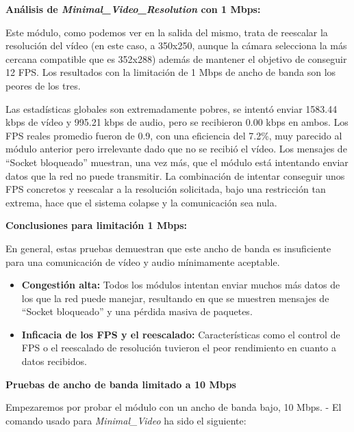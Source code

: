 \vspace{\baselineskip}

\textbf{Análisis de \textit{Minimal\_Video\_Resolution} con 1 Mbps:}
\vspace{\baselineskip}

Este módulo, como podemos ver en la salida del mismo, trata de reescalar la resolución del vídeo (en este caso, a 350x250, aunque la cámara selecciona la más cercana compatible que es 352x288) además de mantener el objetivo de conseguir 12 FPS. Los resultados con la limitación de 1 Mbps de ancho de banda son los peores de los tres.
\vspace{\baselineskip}

Las estadísticas globales son extremadamente pobres, se intentó enviar 1583.44 kbps de vídeo y 995.21 kbps de audio, pero se recibieron 0.00 kbps en ambos. Los FPS reales promedio fueron de 0.9, con una eficiencia del 7.2\%, muy parecido al módulo anterior pero irrelevante dado que no se recibió el vídeo. Los mensajes de ``Socket bloqueado'' muestran, una vez más, que el módulo está intentando enviar datos que la red no puede transmitir. La combinación de intentar conseguir unos FPS concretos y reescalar a la resolución solicitada, bajo una restricción tan extrema, hace que el sistema colapse y la comunicación sea nula.

\textbf{Conclusiones para limitación 1 Mbps:}

En general, estas pruebas demuestran que este ancho de banda es insuficiente para una comunicación de vídeo y audio mínimamente aceptable.
\begin{itemize}
    \item \textbf{Congestión alta:} Todos los módulos intentan enviar muchos más datos de los que la red puede manejar, resultando en que se muestren mensajes de ``Socket bloqueado'' y una pérdida masiva de paquetes.
    \item \textbf{Inficacia de los FPS y el reescalado:} Características como el control de FPS o el reescalado de resolución tuvieron el peor rendimiento en cuanto a datos recibidos.
\end{itemize}

\newpage

\textbf{Pruebas de ancho de banda limitado a 10 Mbps}
\vspace{\baselineskip}

Empezaremos por probar el módulo con un ancho de banda bajo, 10 Mbps.
- El comando usado para \textit{Minimal\_Video} ha sido el siguiente:
\vspace{\baselineskip}

